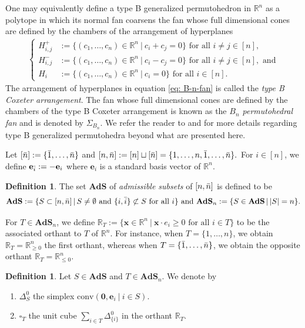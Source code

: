 \documentclass[12pt,reqno]{article}%
\theoremstyle{definition}
\newtheorem{defn}[thm]{Definition}
\numberwithin{equation}{section}
\newcommand{\bbe}{\mathbf{e}}
\newcommand{\bbx}{\mathbf{x}}
\newcommand{\conv}{\mathrm{conv}}
\newcommand{\R}{\mathbb R}
\newcommand{\ads}{\mathbf{AdS}}
\newcommand{\sym}{\Delta^0}
\newcommand{\nn}{[n,\Bar{n}]}
\begin{document}
One may equivalently define a type B generalized permutohedron in $\R^n$ as a polytope in which its normal fan coarsens the fan whose full dimensional cones are defined by the chambers of the arrangement of hyperplanes
\begin{align}\label{eq: B-n-fan}\begin{cases}
    H^+_{i,j} &:= \{ (c_1, \dots, c_n) \in \R^n \ | \ c_i + c_j =0\} \text{ for all } i\neq j \in [n],\\
    H^-_{i,j} &:= \{ (c_1, \dots, c_n) \in \R^n \ | \ c_i - c_j =0\} \text{ for all } i\neq j \in [n], \text{ and}\\
    H_i &:= \{ (c_1, \dots, c_n) \in \R^n \ | \ c_i =0\} \text{ for all } i \in [n].
\end{cases}
\end{align}
The arrangement of hyperplanes in equation \eqref{eq: B-n-fan} is called the \emph{type B Coxeter arrangement}. The fan whose full dimensional cones are defined by the chambers of the type B Coxeter arrangement is known as the \emph{$B_n$ permutohedral fan} and is denoted by $\Sigma_{B_n}.$ We refer the reader to \cite{Bastidas2021} and \cite{Euretall2024} for more details regarding type B generalized permutohedra beyond what are presented here.
    
Let $[\Bar{n}]:= \{\Bar{1}, \dots, \Bar{n}\}$ and $\nn := [n] \sqcup [\Bar{n}] = \{1, \dots, n, \Bar{1}, \dots, \Bar{n}\}.$ For $i \in [n]$, we define $\bbe_{\Bar{i}} := -\bbe_i$ where $\bbe_i$ is a standard basis vector of $\R^n.$ 

\begin{defn}
The set $\ads$ of \emph{admissible subsets} of $\nn$ is defined to be 
\[\ads := \{S \subset \nn \,|\, S\neq \emptyset \text{ and } \{i, \Bar{i}\} \not\subset S \text{ for all } i\} \text{ and } \ads_n := \{S \in \ads\,|\, |S| = n\}.\]
\end{defn} 

For $T \in \ads_n$, we define $\R_T := \{\bbx \in \R^n \ | \ \bbx\cdot e_i \geq 0 \text{ for all } i \in T\}$ to be the associated orthant to $T$ of $\R^n.$ For instance, when $T = \{1,\dots, n\}$, we obtain $\R_T = \R^n_{\geq 0}$ the first orthant, whereas when $T = \{\Bar{1},\dots, \Bar{n}\}$, we obtain the opposite orthant $\R_T = \R^n_{\leq 0}$.

\begin{defn}
    Let $S \in \ads$ and $T \in \ads_n$. We denote by
    \begin{enumerate}
        \item $\sym_S$ the simplex $\conv(\mathbf{0},\bbe_i\ |\ i \in S)$.
        \item $\square_T$ the unit cube $\sum_{i \in T}\sym_{\{i\}}$ in the orthant $\R_T.$
    \end{enumerate}

\end{defn}
\end{document}
